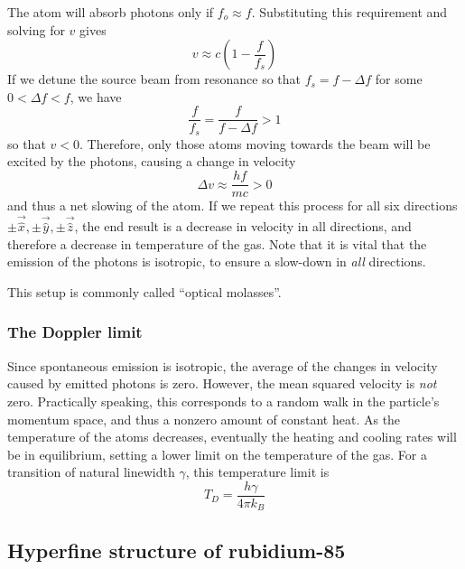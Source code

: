 \documentclass[11pt,twoside,a4paper]{article}
\begin{document}
The atom will absorb photons only if \(f_o\approx f\). Substituting this requirement and solving for \(v\) gives
\begin{equation}
    v\approx c\left(1-\frac{f}{f_s}\right)
\end{equation}
If we detune the source beam from resonance so that \(f_s=f-\Delta f\) for some \(0<\Delta f<f\), we have
\begin{equation}
    \frac{f}{f_s} = \frac{f}{f-\Delta f} > 1
\end{equation}
so that \(v<0\). Therefore, only those atoms moving towards the beam will be excited by the photons, causing a change in velocity
\begin{equation}
    \Delta v\approx\frac{hf}{mc}>0
\end{equation}
and thus a net slowing of the atom. If we repeat this process for all six directions \(\pm\vec{\hat{x}},\pm\vec{\hat{y}},\pm\vec{\hat{z}}\), the end result is a decrease in velocity in all directions, and therefore
a decrease in temperature of the gas. Note that it is vital that the emission of the photons is isotropic, to ensure a slow-down in \textit{all} directions.

This setup is commonly called ``optical molasses''.
\subsubsection{The Doppler limit}
Since spontaneous emission is isotropic, the average of the changes in velocity caused by emitted photons is zero. However, the mean squared velocity is \textit{not} zero.
Practically speaking, this corresponds to a random walk in the particle's momentum space, and thus a nonzero amount of constant heat.
As the temperature of the atoms decreases, eventually the heating and cooling rates will be in equilibrium, setting a lower limit on the temperature of the gas. For a transition of natural linewidth \(\gamma\), this temperature limit is~\cite{lett1989}
\[ T_D = \frac{h\gamma}{4\pi k_B} \]
\subsection{Hyperfine structure of rubidium-85}
\end{document}

